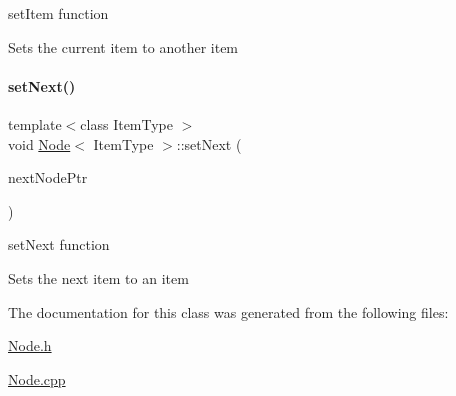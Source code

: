 set\+Item function 

Sets the current item to another item \hypertarget{class_node_a01c1a66d4e39f5b149e090413deb4633}{}\label{class_node_a01c1a66d4e39f5b149e090413deb4633} 
\paragraph{\texorpdfstring{set\+Next()}{setNext()}}
{\footnotesize\ttfamily template$<$class Item\+Type $>$ \\
void \hyperlink{class_node}{Node}$<$ Item\+Type $>$\+::set\+Next (\begin{DoxyParamCaption}\item[{\hyperlink{class_node}{Node}$<$ Item\+Type $>$ $\ast$}]{next\+Node\+Ptr }\end{DoxyParamCaption})}



set\+Next function 

Sets the next item to an item 

The documentation for this class was generated from the following files\+:\begin{DoxyCompactItemize}
\item 
\hyperlink{_node_8h}{Node.\+h}\item 
\hyperlink{_node_8cpp}{Node.\+cpp}\end{DoxyCompactItemize}
